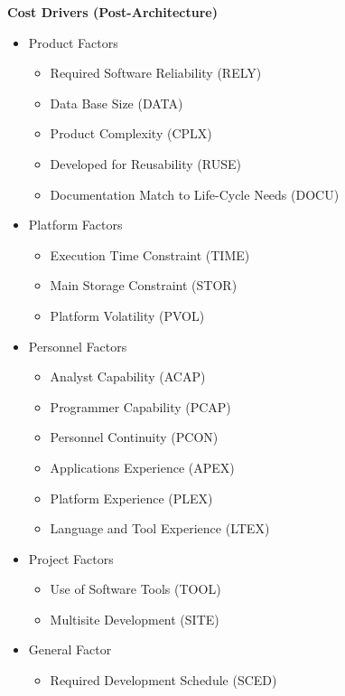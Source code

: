 \textbf{Cost Drivers (Post-Architecture)}\\
\begin{itemize}
    \item Product Factors
    \begin{itemize}
        \item Required Software Reliability (RELY)
        \item Data Base Size (DATA)
        \item Product Complexity (CPLX)
        \item Developed for Reusability (RUSE)
        \item Documentation Match to Life-Cycle Needs (DOCU)
    \end{itemize}
    \item Platform Factors
    \begin{itemize}
        \item Execution Time Constraint (TIME)
        \item Main Storage Constraint (STOR)
        \item Platform Volatility (PVOL)
    \end{itemize}
    \item Personnel Factors
    \begin{itemize}
        \item Analyst Capability (ACAP)
        \item Programmer Capability (PCAP)
        \item Personnel Continuity (PCON)
        \item Applications Experience (APEX)
        \item Platform Experience (PLEX)
        \item Language and Tool Experience (LTEX)
    \end{itemize}
    \item Project Factors
    \begin{itemize}
        \item Use of Software Tools (TOOL)
        \item Multisite Development (SITE)
    \end{itemize}
    \item General Factor
    \begin{itemize}
        \item Required Development Schedule (SCED)
    \end{itemize}
\end{itemize}

